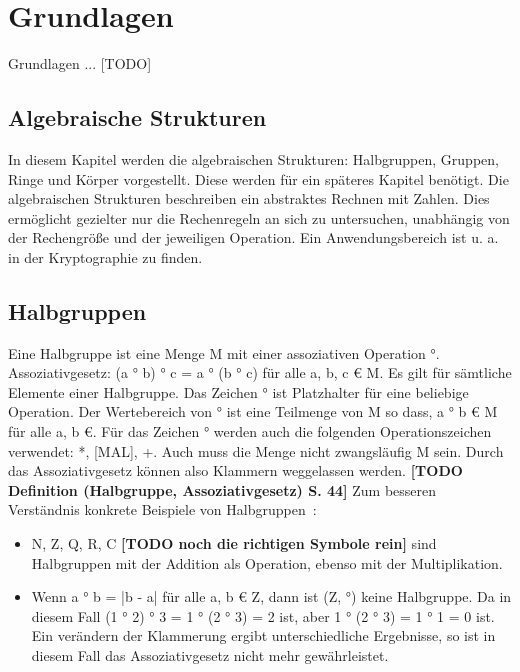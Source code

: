 \section{Grundlagen}
	Grundlagen ... [TODO]
	
	\subsection{Algebraische Strukturen}
		In diesem Kapitel werden die algebraischen Strukturen: Halbgruppen, Gruppen, Ringe und Körper vorgestellt. Diese werden für ein späteres Kapitel benötigt. Die algebraischen Strukturen beschreiben ein abstraktes Rechnen mit Zahlen. Dies ermöglicht gezielter nur die Rechenregeln an sich zu untersuchen, unabhängig von der Rechengröße und der jeweiligen Operation. Ein Anwendungsbereich ist u. a. in der Kryptographie zu finden.~\cite{Kryptographie:und:Algorithmen}
	
		\subsection{Halbgruppen}
			Eine Halbgruppe ist eine Menge M mit einer assoziativen Operation °. Assoziativgesetz: (a ° b) ° c = a ° (b ° c) für alle a, b, c € M. Es gilt für sämtliche Elemente einer Halbgruppe. Das Zeichen ° ist Platzhalter für eine beliebige Operation. Der Wertebereich von ° ist eine Teilmenge von M so dass, a ° b € M für alle a, b €. Für das Zeichen ° werden auch die folgenden Operationszeichen verwendet: *, [MAL], +. Auch muss die Menge nicht zwangsläufig M sein. Durch das Assoziativgesetz können also Klammern weggelassen werden. \textbf{[TODO Definition (Halbgruppe, Assoziativgesetz) S. 44]} Zum besseren Verständnis konkrete Beispiele von Halbgruppen~\cite{Erste:Hilfe:in:Linearer:Algebra}:
			
			\begin{itemize}
				\item N, Z, Q, R, C \textbf{[TODO noch die richtigen Symbole rein]} sind Halbgruppen mit der Addition als Operation, ebenso mit der Multiplikation.
				\item Wenn a ° b = |b - a| für alle a, b € Z, dann ist (Z, °) keine Halbgruppe. Da in diesem Fall (1 ° 2) ° 3 = 1 ° (2 ° 3) = 2 ist, aber 1 ° (2 ° 3) = 1 ° 1 = 0 ist. Ein verändern der Klammerung ergibt unterschiedliche Ergebnisse, so ist in diesem Fall das Assoziativgesetz nicht mehr gewährleistet.
			\end{itemize}
		
